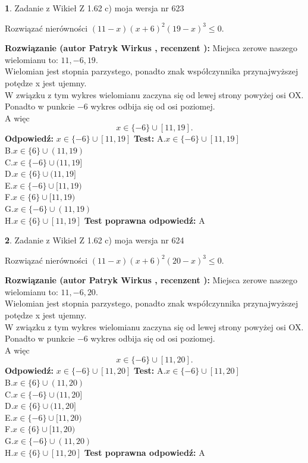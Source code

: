 \documentclass[12pt, a4paper]{article}
\theoremstyle{definition} %
\newtheorem{zad}{}
\newcommand{\zadStart}[1]{\begin{zad}#1\newline}
\newcommand{\zadStop}{\end{zad}}
\newcommand{\rozwStart}[2]{\noindent \textbf{Rozwiązanie (autor #1 , recenzent #2): }\newline}
\newcommand{\rozwStop}{\newline}
\newcommand{\odpStart}{\noindent \textbf{Odpowiedź:}\newline}
\newcommand{\odpStop}{\newline}
\newcommand{\testStart}{\noindent \textbf{Test:}\newline}
\newcommand{\testStop}{\newline}
\newcommand{\kluczStart}{\noindent \textbf{Test poprawna odpowiedź:}\newline}
\newcommand{\kluczStop}{\newline}
\begin{document}
\zadStart{Zadanie z Wikieł Z 1.62 c) moja wersja nr 623}

Rozwiązać nierówności $(11-x)(x+6)^{2}(19-x)^{3}\le0$.
\zadStop
\rozwStart{Patryk Wirkus}{}
Miejsca zerowe naszego wielomianu to: $11, -6, 19$.\\
Wielomian jest stopnia parzystego, ponadto znak współczynnika przy\linebreak najwyższej potędze x jest ujemny.\\ W związku z tym wykres wielomianu zaczyna się od lewej strony powyżej osi OX.\\
Ponadto w punkcie $-6$ wykres odbija się od osi poziomej.\\
A więc $$x \in \{-6\} \cup [11,19].$$
\rozwStop
\odpStart
$x \in \{-6\} \cup [11,19]$
\odpStop
\testStart
A.$x \in \{-6\} \cup [11,19]$\\
B.$x \in \{6\} \cup (11,19)$\\
C.$x \in \{-6\} \cup (11,19]$\\
D.$x \in \{6\} \cup (11,19]$\\
E.$x \in \{-6\} \cup [11,19)$\\
F.$x \in \{6\} \cup [11,19)$\\
G.$x \in \{-6\} \cup (11,19)$\\
H.$x \in \{6\} \cup [11,19]$
\testStop
\kluczStart
A
\kluczStop



\zadStart{Zadanie z Wikieł Z 1.62 c) moja wersja nr 624}

Rozwiązać nierówności $(11-x)(x+6)^{2}(20-x)^{3}\le0$.
\zadStop
\rozwStart{Patryk Wirkus}{}
Miejsca zerowe naszego wielomianu to: $11, -6, 20$.\\
Wielomian jest stopnia parzystego, ponadto znak współczynnika przy\linebreak najwyższej potędze x jest ujemny.\\ W związku z tym wykres wielomianu zaczyna się od lewej strony powyżej osi OX.\\
Ponadto w punkcie $-6$ wykres odbija się od osi poziomej.\\
A więc $$x \in \{-6\} \cup [11,20].$$
\rozwStop
\odpStart
$x \in \{-6\} \cup [11,20]$
\odpStop
\testStart
A.$x \in \{-6\} \cup [11,20]$\\
B.$x \in \{6\} \cup (11,20)$\\
C.$x \in \{-6\} \cup (11,20]$\\
D.$x \in \{6\} \cup (11,20]$\\
E.$x \in \{-6\} \cup [11,20)$\\
F.$x \in \{6\} \cup [11,20)$\\
G.$x \in \{-6\} \cup (11,20)$\\
H.$x \in \{6\} \cup [11,20]$
\testStop
\kluczStart
A
\kluczStop
\end{document}
